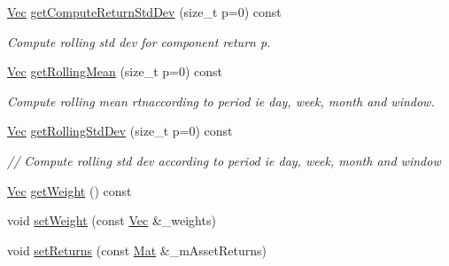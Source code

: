\begin{DoxyCompactItemize}
\item 
\hyperlink{compute__returns__eigen_8h_a1eb6a9306ef406d7975f3cbf2e247777}{Vec} \hyperlink{classPortfolio_a539d00aaacb83cb6b7ed8862db277a0b}{get\+Compute\+Return\+Std\+Dev} (size\+\_\+t p=0) const
\begin{DoxyCompactList}\small\item\em Compute rolling std dev for component return p. \end{DoxyCompactList}\item 
\hyperlink{compute__returns__eigen_8h_a1eb6a9306ef406d7975f3cbf2e247777}{Vec} \hyperlink{classPortfolio_a336d14aaf3bbf9adfe458df6d6b97ce0}{get\+Rolling\+Mean} (size\+\_\+t p=0) const
\begin{DoxyCompactList}\small\item\em Compute rolling mean rtnaccording to period ie day, week, month and window. \end{DoxyCompactList}\item 
\hyperlink{compute__returns__eigen_8h_a1eb6a9306ef406d7975f3cbf2e247777}{Vec} \hyperlink{classPortfolio_a9833a33a238b2416e7c2c4f19ff7be8e}{get\+Rolling\+Std\+Dev} (size\+\_\+t p=0) const
\begin{DoxyCompactList}\small\item\em // Compute rolling std dev according to period ie day, week, month and window \end{DoxyCompactList}\item 
\hyperlink{compute__returns__eigen_8h_a1eb6a9306ef406d7975f3cbf2e247777}{Vec} \hyperlink{classPortfolio_a93c955e745cf06b58f1ce7c7e6fe41e5}{get\+Weight} () const
\item 
void \hyperlink{classPortfolio_a0c05f8c7ae8bd78971524ed06a98deba}{set\+Weight} (const \hyperlink{compute__returns__eigen_8h_a1eb6a9306ef406d7975f3cbf2e247777}{Vec} \&\+\_\+weights)
\item 
void \hyperlink{classPortfolio_a9458c66e10d7a6b8c037ad3584a1e70c}{set\+Returns} (const \hyperlink{compute__returns__eigen_8h_ae14dd28696f743e067dbd2594616bad6}{Mat} \&\+\_\+m\+Asset\+Returns)
\end{DoxyCompactItemize}
